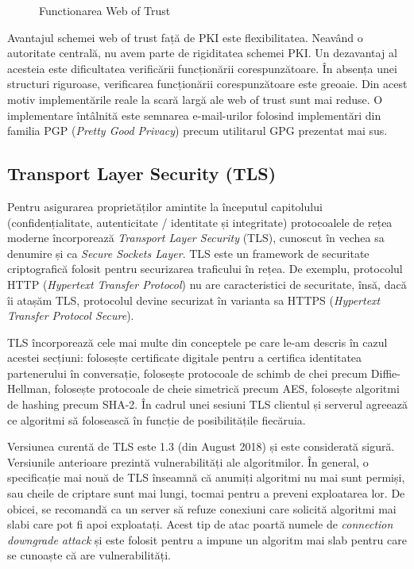 \begin{figure}[htbp]
  \centering
  \def\svgwidth{\columnwidth}
  
  \caption{Functionarea Web of Trust}
  \label{fig:sec:web-of-trust}
\end{figure}

Avantajul schemei web of trust față de PKI este flexibilitatea. Neavând o autoritate centrală, nu avem parte de rigiditatea schemei PKI. Un dezavantaj al acesteia este dificultatea verificării funcționării corespunzătoare. În absența unei structuri riguroase, verificarea funcționării corespunzătoare este greoaie. Din acest motiv implementările reale la scară largă ale web of trust sunt mai reduse. O implementare întâlnită este semnarea e-mail-urilor folosind implementări din familia PGP (\textit{Pretty Good Privacy}) precum utilitarul GPG prezentat mai sus.

\subsection{Transport Layer Security (TLS)}
\label{sec:sec:transfer:tls}

Pentru asigurarea proprietăților amintite la începutul capitolului (confidențialitate, autenticitate / identitate și integritate) protocoalele de rețea moderne încorporează \textit{Transport Layer Security} (TLS), cunoscut în vechea sa denumire și ca \textit{Secure Sockets Layer}. TLS este un framework de securitate criptografică folosit pentru securizarea traficului în rețea. De exemplu, protocolul HTTP (\textit{Hypertext Transfer Protocol}) nu are caracteristici de securitate, însă, dacă îi atașăm TLS, protocolul devine securizat în varianta sa HTTPS (\textit{Hypertext Transfer Protocol Secure}).

TLS încorporează cele mai multe din conceptele pe care le-am descris în cazul acestei secțiuni: folosește certificate digitale pentru a certifica identitatea partenerului în conversație, folosește protocoale de schimb de chei precum Diffie-Hellman, folosește protocoale de cheie simetrică precum AES, folosește algoritmi de hashing precum SHA-2. În cadrul unei sesiuni TLS clientul și serverul agreează ce algoritmi să folosească în funcție de posibilitățile fiecăruia.

Versiunea curentă de TLS este 1.3 (din August 2018) și este considerată sigură. Versiunile anterioare prezintă vulnerabilități ale algoritmilor. În general, o specificație mai nouă de TLS înseamnă că anumiți algoritmi nu mai sunt permiși, sau cheile de criptare sunt mai lungi, tocmai pentru a preveni exploatarea lor. De obicei, se recomandă ca un server să refuze conexiuni care solicită algoritmi mai slabi care pot fi apoi exploatați. Acest tip de atac poartă numele de \textit{connection downgrade attack} și este folosit pentru a impune un algoritm mai slab pentru care se cunoaște că are vulnerabilități.


